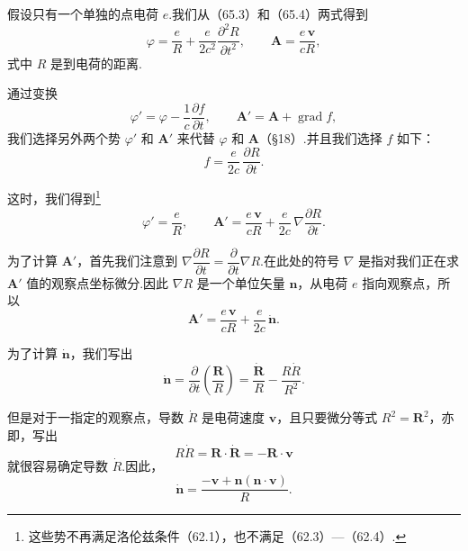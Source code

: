 假设只有一个单独的点电荷 $e$.我们从（65.3）和（65.4）两式得到
\begin{equation}
  \varphi=\frac{e}{R}+\frac{e}{2c^2}\frac{\partial^2 R}{\partial t^2},\qquad
  \boldsymbol{A}=\frac{e\,\boldsymbol{v}}{cR},
\end{equation}
式中 $R$ 是到电荷的距离.

通过变换
\begin{equation*}
  \varphi'=\varphi-\frac{1}{c}\frac{\partial f}{\partial t},\qquad
  \boldsymbol{A}'=\boldsymbol{A}+\operatorname{grad}f,
\end{equation*}
我们选择另外两个势 $\varphi'$ 和 $\boldsymbol{A}'$ 来代替 $\varphi$ 和 $\boldsymbol{A}$（§18）.并且我们选择 $f$ 如下：
\begin{equation*}
  f=\frac{e}{2c}\,\frac{\partial R}{\partial t}.
\end{equation*}

这时，我们得到\footnote{这些势不再满足洛伦兹条件（62.1），也不满足（62.3）—（62.4）.}
\begin{equation*}
  \varphi'=\frac{e}{R},\qquad
  \boldsymbol{A}'=\frac{e\,\boldsymbol{v}}{cR}
  +\frac{e}{2c}\,\nabla\frac{\partial R}{\partial t}.
\end{equation*}

为了计算 $\boldsymbol{A}'$，首先我们注意到
$\nabla\dfrac{\partial R}{\partial t}=\dfrac{\partial}{\partial t}\nabla R$.在此处的符号 $\nabla$ 是指对我们正在求 $\boldsymbol{A}'$ 值的观察点坐标微分.因此 $\nabla R$ 是一个单位矢量 $\boldsymbol{n}$，从电荷 $e$ 指向观察点，所以
\begin{equation*}
  \boldsymbol{A}'=\frac{e\,\boldsymbol{v}}{cR}+\frac{e}{2c}\,\dot{\boldsymbol{n}}.
\end{equation*}

为了计算 $\dot{\boldsymbol{n}}$，我们写出
\begin{equation*}
  \dot{\boldsymbol{n}}=\frac{\partial}{\partial t}
  \left(\frac{\boldsymbol{R}}{R}\right)
  =\frac{\dot{\boldsymbol{R}}}{R}-\frac{R\dot{R}}{R^2}.
\end{equation*}

但是对于一指定的观察点，导数 $\dot{R}$ 是电荷速度 $\boldsymbol{v}$，且只要微分等式 $R^2=\boldsymbol{R}^2$，亦即，写出
\begin{equation*}
  R\dot{R}=\boldsymbol{R}\cdot\dot{\boldsymbol{R}}=-\boldsymbol{R}\cdot\boldsymbol{v}
\end{equation*}
就很容易确定导数 $\dot{R}$.因此，
\begin{equation*}
  \dot{\boldsymbol{n}}=\frac{-\boldsymbol{v}+\boldsymbol{n}(\boldsymbol{n}\cdot\boldsymbol{v})}{R}.
\end{equation*}

